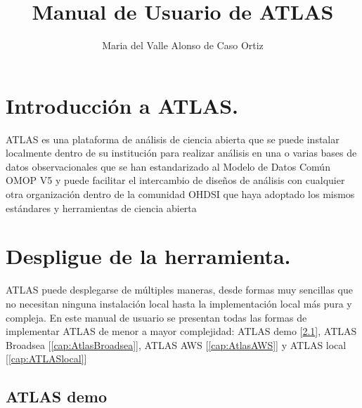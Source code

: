 \documentclass{article}
\title{Manual de Usuario de ATLAS}
\author{Maria del Valle Alonso de Caso Ortiz}
\begin{document}
\maketitle



\section{Introducción a ATLAS.}

ATLAS es una plataforma de análisis de ciencia abierta que se puede instalar localmente dentro de su institución para realizar análisis en una o varias bases de datos observacionales que se han estandarizado al Modelo de Datos Común OMOP V5 y puede facilitar el intercambio de diseños de análisis con cualquier otra organización dentro de la comunidad OHDSI que haya adoptado los mismos estándares y herramientas de ciencia abierta \cite{OHDSIAtlasWiki}



\section{Despligue de la herramienta.}

ATLAS puede desplegarse de múltiples maneras, desde formas muy sencillas que no necesitan ninguna instalación local hasta la implementación local más pura y compleja. En este manual de usuario se presentan todas las formas de implementar ATLAS de menor a mayor complejidad: ATLAS demo [\ref{cap:ATLASdemo}], ATLAS Broadsea [\ref{cap:AtlasBroadsea}], ATLAS AWS [\ref{cap:AtlasAWS}] y ATLAS local [\ref{cap:ATLASlocal}]


\subsection{ATLAS demo} \label{cap:ATLASdemo}
\end{document}

